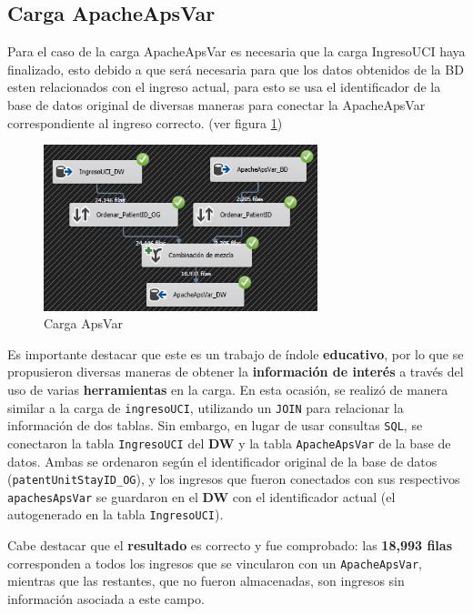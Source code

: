 \documentclass[12pt, a4paper, twoside]{article}
\begin{document}
	\subsection{Carga ApacheApsVar}
	
	Para el caso de la carga ApacheApsVar es necesaria que la carga IngresoUCI haya finalizado, esto debido a que será necesaria para que los datos obtenidos de la BD esten relacionados con el ingreso actual, para esto se usa el identificador de la base de datos original de diversas maneras para conectar la ApacheApsVar correspondiente al ingreso correcto. (ver figura \ref{fig:33})
	
	\begin{figure}[H]
		\centering
		\includegraphics[width=0.71\textwidth]{image/120_ApacheApsVar.png}
		\caption{Carga ApsVar}
		\label{fig:33}
	\end{figure}
	
	Es importante destacar que este es un trabajo de índole \textbf{educativo}, por lo que se propusieron diversas maneras de obtener la \textbf{información de interés} a través del uso de varias \textbf{herramientas} en la carga. En esta ocasión, se realizó de manera similar a la carga de \texttt{ingresoUCI}, utilizando un \texttt{JOIN} para relacionar la información de dos tablas. Sin embargo, en lugar de usar consultas \texttt{SQL}, se conectaron la tabla \texttt{IngresoUCI} del \textbf{DW} y la tabla \texttt{ApacheApsVar} de la base de datos. Ambas se ordenaron según el identificador original de la base de datos (\texttt{patentUnitStayID\_OG}), y los ingresos que fueron conectados con sus respectivos \texttt{apachesApsVar} se guardaron en el \textbf{DW} con el identificador actual (el autogenerado en la tabla \texttt{IngresoUCI}).
	
	Cabe destacar que el \textbf{resultado} es correcto y fue comprobado: las \textbf{18,993 filas} corresponden a todos los ingresos que se vincularon con un \texttt{ApacheApsVar}, mientras que las restantes, que no fueron almacenadas, son ingresos sin información asociada a este campo.
	
\end{document}
